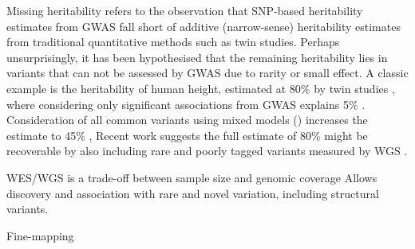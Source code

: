 \begin{outline}
\1 Missing heritability refers to the observation that SNP-based heritability estimates from \gls{GWAS} fall short of additive (narrow-sense) heritability estimates from traditional quantitative methods such as twin studies.
Perhaps unsurprisingly, it has been hypothesised that the remaining heritability lies in variants that can not be assessed by \gls{GWAS} due to rarity or small effect.
A classic example is the heritability of human height, estimated at 80\% by twin studies \autocite{maher2008PersonalGenomesCase}, 
where considering only significant associations from \gls{GWAS} explains 5\% \autocite{maher2008PersonalGenomesCase}.
Consideration of all common variants using mixed models () increases the estimate to 45\% \autocite{yang2010CommonSNPsExplain},
Recent work suggests the full estimate of 80\% might be recoverable by also including rare and poorly tagged variants measured by \gls{WGS} \autocite{wainschtein2019RecoveryTraitHeritability}.

\1 WES/WGS is a trade-off between sample size and genomic coverage
    \2 Allows discovery and association with rare and novel variation, including structural variants.


\1 Fine-mapping


\end{outline}
